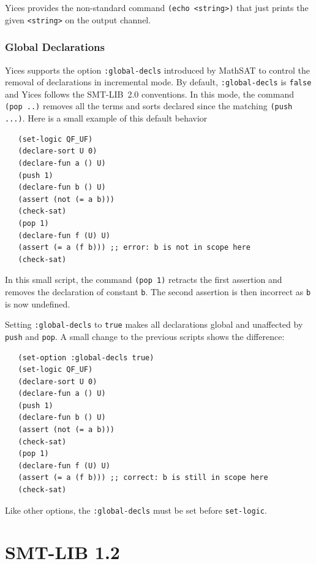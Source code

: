 \documentclass[11pt,twoside,fleqn,openright,titlepage]{cslreport}
\begin{document}
\medskip\noindent Yices provides the non-standard command
\texttt{(echo <string>)} that just prints the given \texttt{<string>}
on the output channel.

\subsubsection*{Global Declarations}

Yices supports the option \texttt{:global-decls} introduced by MathSAT
to control the removal of declarations in incremental mode. By
default, \texttt{:global-decls} is \texttt{false} and Yices follows
the SMT-LIB~2.0 conventions. In this mode, the command \texttt{(pop
  ..)}  removes all the terms and sorts declared since the matching
\texttt{(push ...)}. Here is a small example of this default behavior
\begin{small}
\begin{verbatim}
   (set-logic QF_UF)
   (declare-sort U 0)
   (declare-fun a () U)
   (push 1)
   (declare-fun b () U)
   (assert (not (= a b)))
   (check-sat)
   (pop 1)
   (declare-fun f (U) U)
   (assert (= a (f b))) ;; error: b is not in scope here
   (check-sat)
\end{verbatim}
\end{small}
In this small script, the command \texttt{(pop 1)} retracts the first
assertion and removes the declaration of constant \texttt{b}.  The
second assertion is then incorrect as \texttt{b} is now undefined.

\medskip\noindent Setting \texttt{:global-decls} to \texttt{true}
makes all declarations global and unaffected by \texttt{push} and
\texttt{pop}. A small change to the previous scripts shows the difference:
\begin{small}
\begin{verbatim}
   (set-option :global-decls true)
   (set-logic QF_UF)
   (declare-sort U 0)
   (declare-fun a () U)
   (push 1)
   (declare-fun b () U)
   (assert (not (= a b)))
   (check-sat)
   (pop 1)
   (declare-fun f (U) U)
   (assert (= a (f b))) ;; correct: b is still in scope here
   (check-sat)
\end{verbatim}
\end{small}
Like other options, the \texttt{:global-decls} must be set before
\texttt{set-logic}.


\section{SMT-LIB 1.2}
\end{document}
